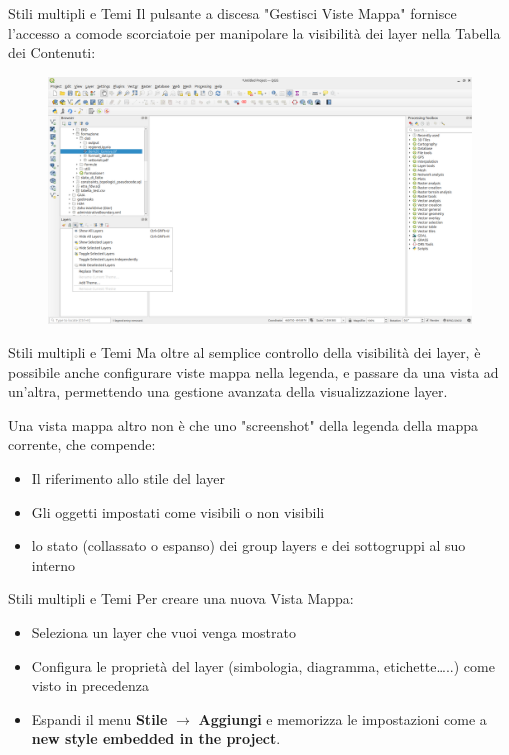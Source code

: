\documentclass{beamer}
\begin{document}
{\begin{frame}{Stili multipli e Temi}
    Il pulsante a discesa "Gestisci Viste Mappa" fornisce l’accesso a comode scorciatoie per manipolare la visibilità dei layer nella Tabella dei Contenuti:
    \begin{figure}
         \centering
         \includegraphics[width=0.75\linewidth]{digitizing_pics/stili_multipli_1.png}
     
    \end{figure} 
\end{frame}

\begin{frame}{Stili multipli e Temi}
    Ma oltre al semplice controllo della visibilità dei layer, è possibile anche configurare viste mappa nella legenda, e passare da una vista ad un'altra, permettendo una gestione avanzata della visualizzazione layer.

    Una vista mappa altro non è che uno "screenshot" della legenda della mappa corrente, che compende:
    \begin{itemize}
            \item Il riferimento allo stile del layer
            \item Gli oggetti impostati come visibili o non visibili
            \item lo stato (collassato o espanso) dei group layers e dei sottogruppi al suo interno
    \end{itemize}

\end{frame}

\begin{frame}{Stili multipli e Temi}
    Per creare una nuova Vista Mappa:
    \begin{itemize}
            \item Seleziona un layer che vuoi venga mostrato
            \item Configura le proprietà del layer (simbologia, diagramma, etichette…..) come visto in precedenza
            \item Espandi il menu \textbf{Stile} $\rightarrow$  \textbf{Aggiungi} e memorizza le impostazioni come a \textbf{new style embedded in the project}.
    \end{itemize}
\end{frame}

}
\end{document}

